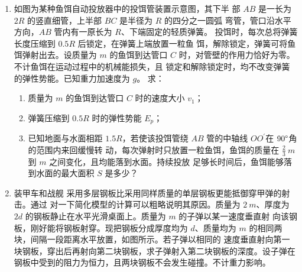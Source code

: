 \begin{enumerate}
\newpage
\item 
{}
如图为某种鱼饵自动投放器中的投饵管装置示意图，其下半
部 $ AB $ 是一长为 $ 2R $ 的竖直细管，上半部 $ BC $ 是半径为 $ R $ 的四分之一圆弧
弯管，管口沿水平方向，$ AB $ 管内有一原长为 $ R $、下端固定的轻质弹簧。
投饵时，每次总将弹簧长度压缩到 $ 0.5R $ 后锁定，在弹簧上端放置一粒鱼
饵，解除锁定，弹簧可将鱼饵弹射出去。设质量为 $ m $ 的鱼饵到达管口 $ C $
时，对管壁的作用力恰好为零。不计鱼饵在运动过程中的机械能损失，且
锁定和解除锁定时，均不改变弹簧的弹性势能。已知重力加速度为 $ g $。
求：
\begin{enumerate}
\renewcommand{\labelenumi}{\arabic{enumi}.}
\item
质量为 $ m $ 的鱼饵到达管口 $ C $ 时的速度大小 $ v_{1} $；
\item 
弹簧压缩到 $ 0.5R $ 时的弹性势能 $ E_{p} $；
\item 
已知地面与水面相距 $ 1.5R $，若使该投饵管绕 $ AB $ 管的中轴线 $ OO ^{\prime} $在 $ 90 \degree $角的范围内来回缓慢转
动，每次弹射时只放置一粒鱼饵，鱼饵的质量在 $ \frac{ 2 }{ 3 } \ m $ 到 $ m $ 之间变化，且均能落到水面。持续投放
足够长时间后，鱼饵能够落到水面的最大面积 $ S $ 是多少？




\end{enumerate}
\begin{figure}[h!]
\flushright

\end{figure}




\newpage
\item 
{}
装甲车和战舰 采用多层钢板比采用同样质量的单层钢板更能抵御穿甲弹的射击。通过
对一下简化模型的计算可以粗略说明其原因。质量为 $ 2 \ m $、厚度为 $ 2d $
的钢板静止在水平光滑桌面上。质量为 $ m $ 的子弹以某一速度垂直射
向该钢板，刚好能将钢板射穿。现把钢板分成厚度均为 $ d $、质量均为
$ m $ 的相同两块，间隔一段距离水平放置，如图所示。若子弹以相同的
速度垂直射向第一块钢板，穿出后再射向第二块钢板，求子弹射入第二块钢板的深度。设子弹在
钢板中受到的阻力为恒力，且两块钢板不会发生碰撞。不计重力影响。
\begin{figure}[h!]
\flushright

\end{figure}


\end{enumerate}
